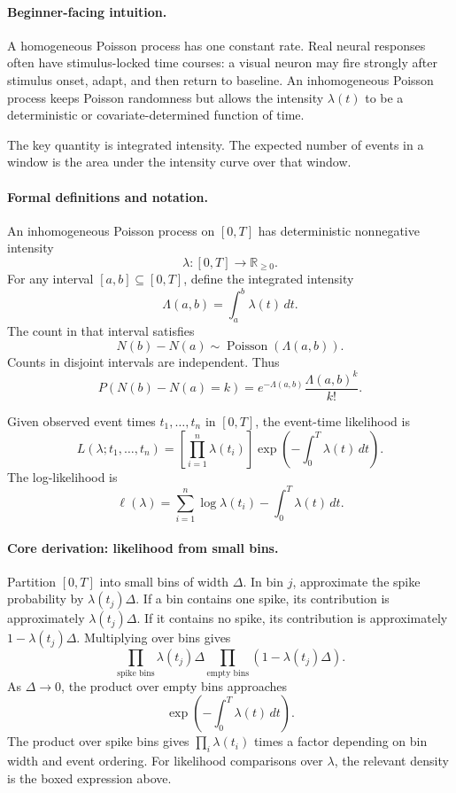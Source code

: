 \paragraph{Beginner-facing intuition.}
A homogeneous Poisson process has one constant rate. Real neural responses often have stimulus-locked time courses: a visual neuron may fire strongly after stimulus onset, adapt, and then return to baseline. An inhomogeneous Poisson process keeps Poisson randomness but allows the intensity \(\lambda(t)\) to be a deterministic or covariate-determined function of time.

The key quantity is integrated intensity. The expected number of events in a window is the area under the intensity curve over that window.

\paragraph{Formal definitions and notation.}
An inhomogeneous Poisson process on \([0,T]\) has deterministic nonnegative intensity
\[
\lambda\colon [0,T]\to\mathbb{R}_{\geq 0}.
\]
For any interval \([a,b]\subseteq[0,T]\), define the integrated intensity
\[
\boxed{\Lambda(a,b)=\int_a^b\lambda(t)\,dt.}
\]
The count in that interval satisfies
\[
N(b)-N(a)\sim\operatorname{Poisson}(\Lambda(a,b)).
\]
Counts in disjoint intervals are independent. Thus
\[
P(N(b)-N(a)=k)=e^{-\Lambda(a,b)}\frac{\Lambda(a,b)^k}{k!}.
\]

Given observed event times \(t_1,\ldots,t_n\) in \([0,T]\), the event-time likelihood is
\[
\boxed{
L(\lambda;t_1,\ldots,t_n)
=\left[\prod_{i=1}^n\lambda(t_i)\right]
\exp\!\left(-\int_0^T\lambda(t)\,dt\right).
}
\]
The log-likelihood is
\[
\ell(\lambda)=\sum_{i=1}^n\log\lambda(t_i)-\int_0^T\lambda(t)\,dt.
\]

\paragraph{Core derivation: likelihood from small bins.}
Partition \([0,T]\) into small bins of width \(\Delta\). In bin \(j\), approximate the spike probability by \(\lambda(t_j)\Delta\). If a bin contains one spike, its contribution is approximately \(\lambda(t_j)\Delta\). If it contains no spike, its contribution is approximately \(1-\lambda(t_j)\Delta\). Multiplying over bins gives
\[
\prod_{\text{spike bins}}\lambda(t_j)\Delta
\prod_{\text{empty bins}}(1-\lambda(t_j)\Delta).
\]
As \(\Delta\to0\), the product over empty bins approaches
\[
\exp\!\left(-\int_0^T\lambda(t)\,dt\right).
\]
The product over spike bins gives \(\prod_i\lambda(t_i)\) times a factor depending on bin width and event ordering. For likelihood comparisons over \(\lambda\), the relevant density is the boxed expression above.


